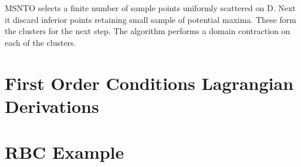 \documentclass[12pt]{article}
\begin{document}
MSNTO selects a finite number of sample points uniformly scattered on D.  Next it discard inferior points retaining small sample of potential maxima.  These form the clusters for the next step.  The algorithm performs a domain contraction on each of the clusters.




\section{First Order Conditions Lagrangian Derivations}
\label{sec:folag}



\section{RBC Example}
\label{sec:rbc-example-1}
\end{document}
